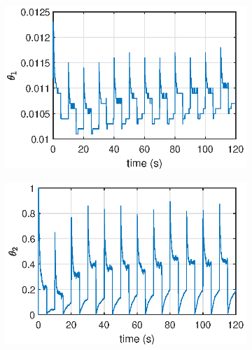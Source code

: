 \begin{figure}[H]
    \begin{minipage}{0.49\textwidth}
        \begin{figure}[H]
            \centering
            \includegraphics[width=\textwidth]{Part2/figs/4_figs/results/th1.eps}
        \end{figure}
    \end{minipage}
    \begin{minipage}{0.49\textwidth}
        \begin{figure}[H]
            \centering
            \includegraphics[width=\textwidth]{Part2/figs/4_figs/results/th2.eps}
        \end{figure}
    \end{minipage}
\end{figure}
